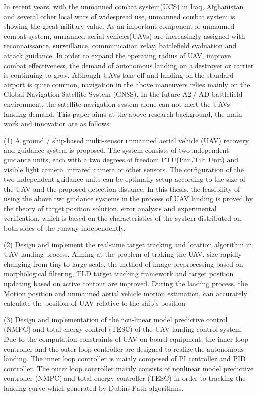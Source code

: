 \begin{eabstract}
 In recent years, with the unmanned combat system(UCS) in Iraq, Afghanistan and several other local wars of widespread use, unmanned combat system is showing the great military value. As an important component of unmanned combat system, unmanned aerial vehicles(UAVs) are increasingly assigned with reconnaissance, surveillance, communication relay, battlefield evaluation and attack guidance. In order to expand the operating radius of UAV, improve combat effectiveness, the demand of autonomous landing on a destroyer or carrier is continuing to grow. Although UAVs take off and landing on the standard airport is quite common, navigation in the above maneuvers relies mainly on the Global Navigation Satellite System (GNSS). In the future A2 / AD battlefield environment, the satellite navigation system alone can not meet the UAVs' landing demand. This paper aims at the above research background, the main work and innovation are as follows:
 
(1) A ground / ship-based multi-sensor unmanned aerial vehicle (UAV) recovery and guidance system is proposed. The system consists of two independent guidance units, each with a two degrees of freedom PTU(Pan/Tilt Unit) and visible light camera, infrared camera or other sensors. The configuration of the two independent guidance units can be optimally setup according to the size of the UAV and the proposed detection distance. In this thesis, the feasibility of using the above two guidance systems in the process of UAV landing is proved by the theory of target position solution, error analysis and experimental verification, which is based on the characteristics of the system distributed on both sides of the runway independently.

(2) Design and implement the real-time target tracking and location algorithm in UAV landing process. Aiming at the problem of traking the UAV, size rapidly changing from tiny to large scale, the method of image preprocessing based on morphological filtering, TLD target tracking framework and target position updating based on active contour are improved. During the landing process, the Motion position and unmanned aerial vehicle motion estimation, can accurately calculate the position of UAV relative to the ship's position 

(3) Design and implementation of the non-linear model predictive control (NMPC) and total energy control (TESC) of the UAV landing control system. Due to the computation constraints of UAV on-board equipment, the inner-loop controller and the outer-loop controller are designed to realize the autonomous landing. The inner loop controller is mainly composed of PI controller and PID controller. The outer loop controller mainly consists of nonlinear model predictive controller (NMPC) and total energy controller (TESC) in order to tracking the landing curve which generated by Dubins Path algorithms.


\end{eabstract}
